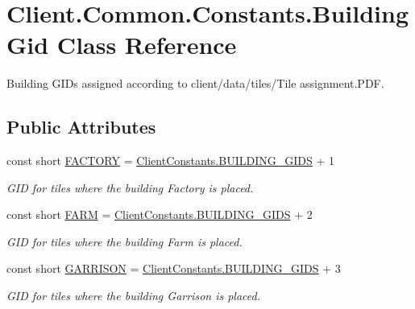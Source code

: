 \hypertarget{classClient_1_1Common_1_1Constants_1_1BuildingGid}{}\section{Client.\+Common.\+Constants.\+Building\+Gid Class Reference}
\label{classClient_1_1Common_1_1Constants_1_1BuildingGid}


Building G\+I\+Ds assigned according to \textquotesingle{}client/data/tiles/\+Tile assignment.\+P\+D\+F\textquotesingle{}.  


\subsection*{Public Attributes}
\begin{DoxyCompactItemize}
\item 
const short \hyperlink{classClient_1_1Common_1_1Constants_1_1BuildingGid_a89b0da51d43f94f88fdf5f11ea841910}{F\+A\+C\+T\+O\+R\+Y} = \hyperlink{classClient_1_1Common_1_1Constants_1_1ClientConstants_ad2e944ac733f952d3d0c2e24fe5d14ad}{Client\+Constants.\+B\+U\+I\+L\+D\+I\+N\+G\+\_\+\+G\+I\+D\+S} + 1
\begin{DoxyCompactList}\small\item\em G\+I\+D for tiles where the building Factory is placed. \end{DoxyCompactList}\item 
const short \hyperlink{classClient_1_1Common_1_1Constants_1_1BuildingGid_ad58b65dd9dbd19ff80536796cb2d553e}{F\+A\+R\+M} = \hyperlink{classClient_1_1Common_1_1Constants_1_1ClientConstants_ad2e944ac733f952d3d0c2e24fe5d14ad}{Client\+Constants.\+B\+U\+I\+L\+D\+I\+N\+G\+\_\+\+G\+I\+D\+S} + 2
\begin{DoxyCompactList}\small\item\em G\+I\+D for tiles where the building Farm is placed. \end{DoxyCompactList}\item 
const short \hyperlink{classClient_1_1Common_1_1Constants_1_1BuildingGid_aa9addbf69a0104b5a094391689421680}{G\+A\+R\+R\+I\+S\+O\+N} = \hyperlink{classClient_1_1Common_1_1Constants_1_1ClientConstants_ad2e944ac733f952d3d0c2e24fe5d14ad}{Client\+Constants.\+B\+U\+I\+L\+D\+I\+N\+G\+\_\+\+G\+I\+D\+S} + 3
\begin{DoxyCompactList}\small\item\em G\+I\+D for tiles where the building Garrison is placed. \end{DoxyCompactList}\item 

\end{DoxyCompactItemize}
